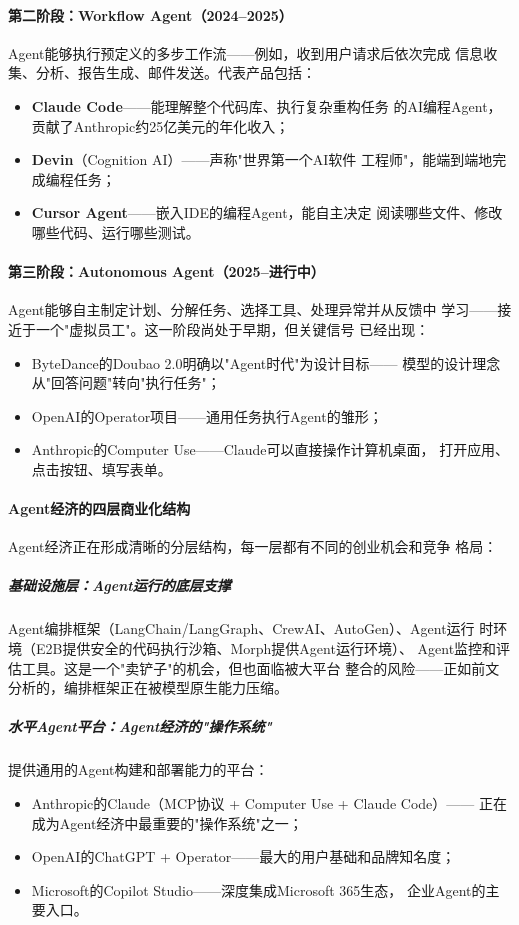 \paragraph{第二阶段：Workflow Agent（2024--2025）}
Agent能够执行预定义的多步工作流——例如，收到用户请求后依次完成
信息收集、分析、报告生成、邮件发送。代表产品包括：
\begin{itemize}
  \item \textbf{Claude Code}——能理解整个代码库、执行复杂重构任务
    的AI编程Agent，贡献了Anthropic约25亿美元的年化收入；
  \item \textbf{Devin}（Cognition AI）——声称"世界第一个AI软件
    工程师"，能端到端地完成编程任务；
  \item \textbf{Cursor Agent}——嵌入IDE的编程Agent，能自主决定
    阅读哪些文件、修改哪些代码、运行哪些测试。
\end{itemize}

\paragraph{第三阶段：Autonomous Agent（2025--进行中）}
Agent能够自主制定计划、分解任务、选择工具、处理异常并从反馈中
学习——接近于一个"虚拟员工"。这一阶段尚处于早期，但关键信号
已经出现：
\begin{itemize}
  \item ByteDance的Doubao 2.0明确以"Agent时代"为设计目标——
    模型的设计理念从"回答问题"转向"执行任务"；
  \item OpenAI的Operator项目——通用任务执行Agent的雏形；
  \item Anthropic的Computer Use——Claude可以直接操作计算机桌面，
    打开应用、点击按钮、填写表单。
\end{itemize}


\paragraph{Agent经济的四层商业化结构}

Agent经济正在形成清晰的分层结构，每一层都有不同的创业机会和竞争
格局：

\subparagraph{基础设施层：Agent运行的底层支撑}
Agent编排框架（LangChain/LangGraph、CrewAI、AutoGen）、Agent运行
时环境（E2B提供安全的代码执行沙箱、Morph提供Agent运行环境）、
Agent监控和评估工具。这是一个"卖铲子"的机会，但也面临被大平台
整合的风险——正如前文分析的，编排框架正在被模型原生能力压缩。

\subparagraph{水平Agent平台：Agent经济的"操作系统"}
提供通用的Agent构建和部署能力的平台：
\begin{itemize}
  \item Anthropic的Claude（MCP协议 + Computer Use + Claude Code）——
    正在成为Agent经济中最重要的"操作系统"之一；
  \item OpenAI的ChatGPT + Operator——最大的用户基础和品牌知名度；
  \item Microsoft的Copilot Studio——深度集成Microsoft 365生态，
    企业Agent的主要入口。
\end{itemize}

